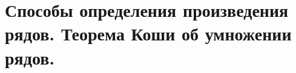 \documentclass[../main.tex]{subfiles}
\begin{document}
\newpage
\section{Способы определения произведения рядов. Теорема Коши об умножении рядов.}
\end{document}
